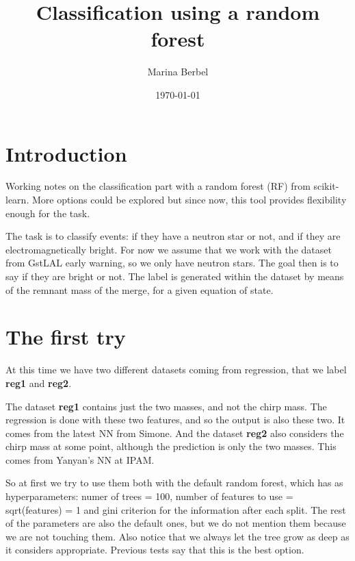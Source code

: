 \documentclass[prd,aps,twocolumn,a4paper,showkeys,nofootinbib]{revtex4-2}
\begin{document}
\title{Classification using a random forest}

\author{Marina Berbel}

\date{\today}

\maketitle

\section{Introduction}
Working notes on the classification part with a random forest (RF) from scikit-learn. More options could be explored but since now, this tool provides flexibility enough for the task.

The task is to classify events: if they have a neutron star or not, and if they are electromagnetically bright. For now we assume that we work with the dataset from GstLAL early warning, so we only have neutron stars. The goal then is to say if they are bright or not. The label is generated within the dataset by means of the remnant  mass of the merge, for a given equation of state.



\section{The first try}
At this time we have two different datasets coming from regression, that we label \textbf{reg1} and \textbf{reg2}.

The dataset \textbf{reg1} contains just the two masses, and not the chirp mass. The regression is done with these two features, and so the output is also these two. It comes from the latest NN from Simone. And the dataset \textbf{reg2} also considers the chirp mass at some point, although the prediction is only the two masses. This comes from Yanyan's NN at IPAM.

So at first we try to use them both with the default random forest, which has as hyperparameters: numer of trees = 100, number of features to use = sqrt(features) = 1 and gini criterion for the information after each split. The rest of the parameters are also the default ones, but we do not mention them because we are not touching them. Also notice that we always let the tree grow as deep as it considers appropriate. Previous tests say that this is the best option.
\end{document}
